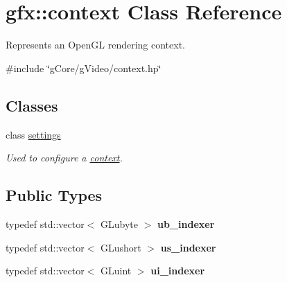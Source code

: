 \hypertarget{classgfx_1_1context}{\section{gfx\-:\-:context Class Reference}
\label{classgfx_1_1context}
}


Represents an Open\-G\-L rendering context.  




{\ttfamily \#include \char`\"{}g\-Core/g\-Video/context.\-hp\char`\"{}}

\subsection*{Classes}
\begin{DoxyCompactItemize}
\item 
class \hyperlink{classgfx_1_1context_1_1settings}{settings}
\begin{DoxyCompactList}\small\item\em Used to configure a \hyperlink{classgfx_1_1context}{context}. \end{DoxyCompactList}\end{DoxyCompactItemize}
\subsection*{Public Types}
\begin{DoxyCompactItemize}
\item 
\hypertarget{classgfx_1_1context_a8b1f7ba6e8a44dd16078d4084eef50ff}{typedef std\-::vector$<$ G\-Lubyte $>$ {\bfseries ub\-\_\-indexer}}\label{classgfx_1_1context_a8b1f7ba6e8a44dd16078d4084eef50ff}

\item 
\hypertarget{classgfx_1_1context_ae58ebbe469b3a22bf3e66ea7908cb877}{typedef std\-::vector$<$ G\-Lushort $>$ {\bfseries us\-\_\-indexer}}\label{classgfx_1_1context_ae58ebbe469b3a22bf3e66ea7908cb877}

\item 
\hypertarget{classgfx_1_1context_ac1f08fb34b7dad45044044611a76ec0c}{typedef std\-::vector$<$ G\-Luint $>$ {\bfseries ui\-\_\-indexer}}\label{classgfx_1_1context_ac1f08fb34b7dad45044044611a76ec0c}

\end{DoxyCompactItemize}
